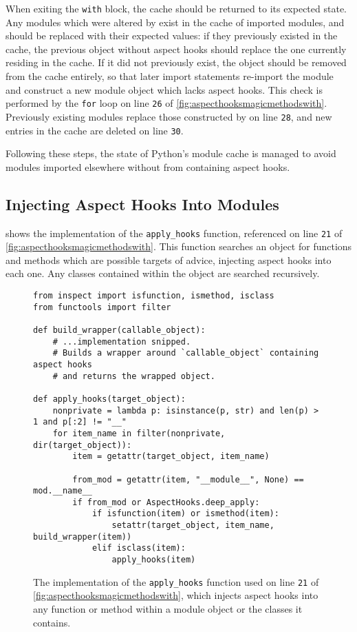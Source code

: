 When exiting the \lstinline{with} block, the cache should be returned to its
expected state. Any modules which were altered by \pdsf{} exist in the cache of
imported modules, and should be replaced with their expected values: if they
previously existed in the cache, the previous object without aspect hooks should
replace the one currently residing in the cache. If it did not previously exist,
the object should be removed from the cache entirely, so that later import
statements re-import the module and construct a new module object which lacks
aspect hooks. This check is performed by the \lstinline{for} loop on line
\texttt{26} of \cref{fig:aspecthooksmagicmethodswith}. Previously existing
modules replace those constructed by \pdsf{} on line \texttt{28}, and new
entries in the cache are deleted on line \texttt{30}.

Following these steps, the state of Python's module cache is managed to avoid
modules imported elsewhere without \pdsf{} from containing aspect hooks.

\subsection{Injecting Aspect Hooks Into Modules}
\label{injecting_aspect_hooks_when_importing}

 shows the implementation of the
\lstinline{apply_hooks} function, referenced on line \texttt{21} of
\cref{fig:aspecthooksmagicmethodswith}. This function searches an
object for functions and methods which are possible targets of advice, injecting
aspect hooks into each one. Any classes contained within the object are searched
recursively.

\begin{figure}
    \centering
    \begin{lstlisting}[style=small_python]
from inspect import isfunction, ismethod, isclass
from functools import filter

def build_wrapper(callable_object):
    # ...implementation snipped.
    # Builds a wrapper around `callable_object` containing aspect hooks
    # and returns the wrapped object.

def apply_hooks(target_object):
    nonprivate = lambda p: isinstance(p, str) and len(p) > 1 and p[:2] != "__"
    for item_name in filter(nonprivate, dir(target_object)):
        item = getattr(target_object, item_name)

        from_mod = getattr(item, "__module__", None) == mod.__name__
        if from_mod or AspectHooks.deep_apply:
            if isfunction(item) or ismethod(item):
                setattr(target_object, item_name, build_wrapper(item))
            elif isclass(item):
                apply_hooks(item)
    \end{lstlisting}
    \caption{The implementation of the \lstinline{apply_hooks} function used on
    line \texttt{21} of \cref{fig:aspecthooksmagicmethodswith}, which injects
    aspect hooks into any function or method within a module object or the
    classes it contains.}
    \label{fig:apply_hooks_to_module}
\end{figure}

